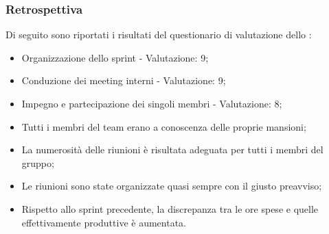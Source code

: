 \subsubsection{Retrospettiva}

\par Di seguito sono riportati i risultati del questionario di valutazione dello :
\begin{itemize}
  \item Organizzazione dello sprint - Valutazione: 9;
  \item Conduzione dei meeting interni - Valutazione: 9;
  \item Impegno e partecipazione dei singoli membri - Valutazione: 8;
  \item Tutti i membri del team erano a conoscenza delle proprie mansioni;
  \item La numerosità delle riunioni è risultata adeguata per tutti i membri del gruppo;
  \item Le riunioni sono state organizzate quasi sempre con il giusto preavviso;
  \item Rispetto allo sprint precedente, la discrepanza tra le ore spese e quelle effettivamente produttive è aumentata.
\end{itemize}

